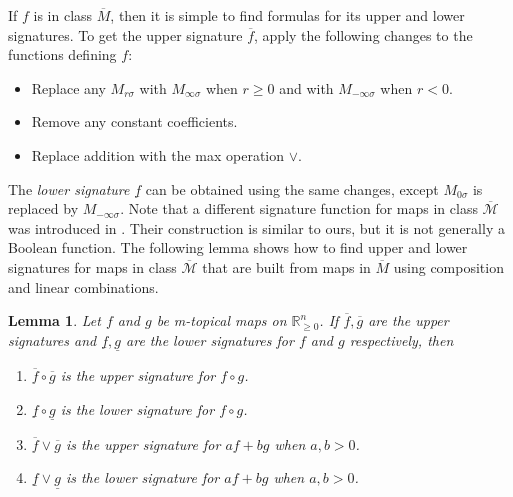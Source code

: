 \documentclass[10pt,reqno]{amsart}
\newcommand{\R}{\mathbb{R}}
\newcommand{\sign}{\operatorname{sgn}}
\theoremstyle{plain}
\newtheorem{lemma}[theorem]{Lemma}
\theoremstyle{definition}
\numberwithin{equation}{section}
\begin{document}
If $f$ is in class $\overline{M}$, then it is simple to find formulas for its upper and lower signatures.  To get the upper signature $\overline{f}$, apply the following changes to the functions defining $f$: 
\begin{itemize}
\item Replace any $M_{r\sigma}$ with $M_{\infty \sigma}$ when $r \ge 0$ and with $M_{-\infty \sigma}$ when $r < 0$.  
\item Remove any constant coefficients.
\item Replace addition with the max operation $\vee$.  
\end{itemize}
The \emph{lower signature} $\underline{f}$ can be obtained using the same changes, except $M_{0 \sigma}$ is replaced by $M_{-\infty \sigma}$.
Note that a different signature function for maps in class $\overline{\mathcal{M}}$ was introduced in \cite[Section 5.2]{AkianGaubertHochart20}.  Their construction is similar to ours, but it is not generally a Boolean function. %
The following lemma shows how to find upper and lower signatures for maps in class $\overline{\mathcal{M}}$ that are built from maps in $\overline{M}$ using composition and linear combinations.  
\begin{lemma}
Let $f$ and $g$ be m-topical maps on $\R^n_{\ge 0}$. If $\overline{f}, \overline{g}$ are the upper signatures and $\underline{f}, \underline{g}$ are the lower signatures for $f$ and $g$ respectively, then
\begin{enumerate}
\item \label{item:comp} $\overline{f} \circ \overline{g}$ is the upper signature for $f \circ g$. 
\item \label{item:comp2} $\underline{f} \circ \underline{g}$ is the lower signature for $f \circ g$. 
\item \label{item:sum} $\overline{f} \vee \overline{g}$ is the upper signature for $a f + b g$ when $a, b > 0$.  
\item \label{item:sum2} $\underline{f} \vee \underline{g}$ is the lower signature for $a f + b g$ when $a, b > 0$.  
\end{enumerate}
\end{lemma}
\end{document}
